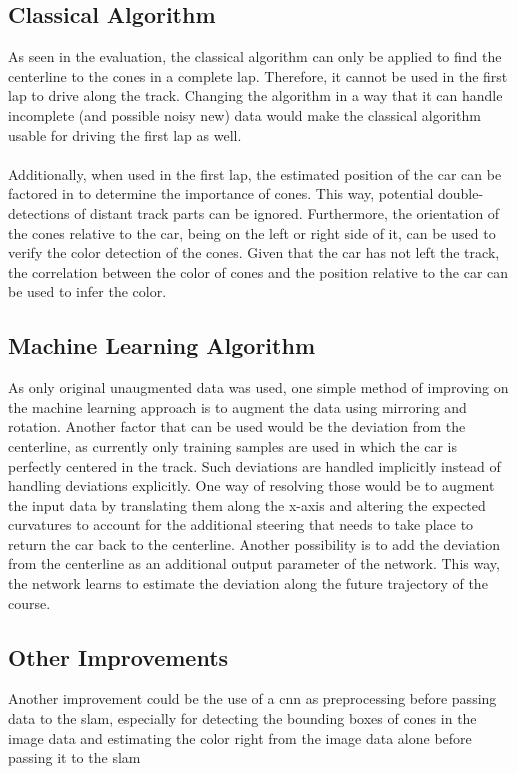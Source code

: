 \subsection{Classical Algorithm}
As seen in the evaluation, the classical algorithm can only be applied to find the centerline to the cones in a complete lap. Therefore, it cannot be used in the first lap to drive along the track. Changing the algorithm in a way that it can handle incomplete (and possible noisy new) data would make the classical algorithm usable for driving the first lap as well. \\
\\Additionally, when used in the first lap, the estimated position of the car can be factored in to determine the importance of cones. This way, potential double-detections of distant track parts can be ignored. Furthermore, the orientation of the cones relative to the car, being on the left or right side of it, can be used to verify the color detection of the cones. Given that the car has not left the track, the correlation between the color of cones and the position relative to the car can be used to infer the color.
\subsection{Machine Learning Algorithm}
As  only original unaugmented data was used, one simple method of improving on the machine learning approach is to augment the data using mirroring and rotation. Another factor that can be used would be the deviation from the centerline, as currently only training samples are used in which the car is perfectly centered in the track. Such deviations are handled implicitly instead of handling deviations explicitly. One way of resolving those would be to augment the input data by translating them along the x-axis and altering the expected curvatures to account for the additional steering that needs to take place to return the car back to the centerline. Another possibility is to add the deviation from the centerline as an additional output parameter of the network. This way, the network learns to estimate the deviation along the future trajectory of the course.
\subsection{Other Improvements}
Another improvement could be the use of a \ac{cnn} as preprocessing before passing data to the \ac{slam}, especially for detecting the bounding boxes of cones in the image data and estimating the color right from the image data alone before passing it to the \ac{slam}
